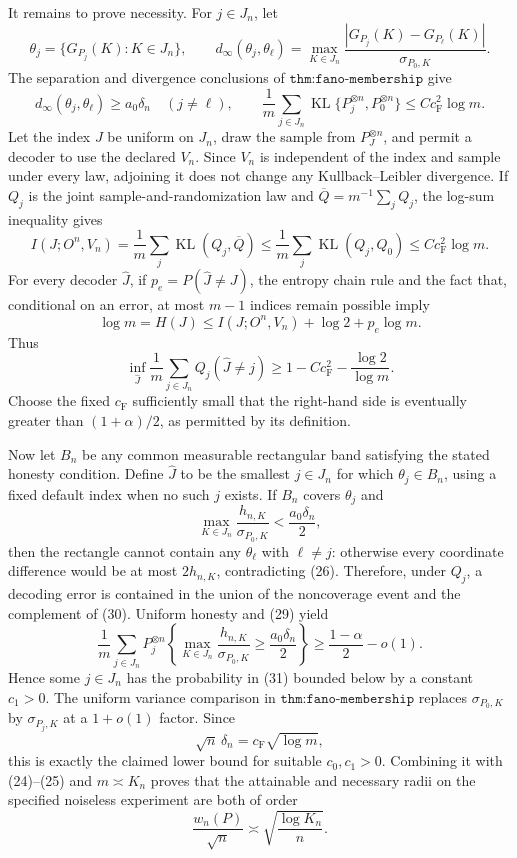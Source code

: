It remains to prove necessity.  For \(j\in J_n\), let
\[
 \theta_j=\{G_{P_j}(K):K\in J_n\},\qquad
 d_\infty(\theta_j,\theta_\ell)
 =\max_{K\in J_n}
 \frac{|G_{P_j}(K)-G_{P_\ell}(K)|}{\sigma_{P_0,K}}.
\]
The separation and divergence conclusions of \(\texttt{thm:fano-membership}\) give
\[
 d_\infty(\theta_j,\theta_\ell)\geq a_0\delta_n
 \quad(j\ne\ell),\qquad
 \frac1m\sum_{j\in J_n}
 \operatorname{KL}\{P_j^{\otimes n},P_0^{\otimes n}\}
 \leq Cc_{\mathrm F}^2\log m.
 \tag{26}
\]
Let the index \(J\) be uniform on \(J_n\), draw the sample from \(P_J^{\otimes n}\), and permit a decoder to use the declared \(V_n\).  Since \(V_n\) is independent of the index and sample under every law, adjoining it does not change any Kullback--Leibler divergence.  If \(Q_j\) is the joint sample-and-randomization law and \(\overline Q=m^{-1}\sum_jQ_j\), the log-sum inequality gives
\[
 I(J;O^n,V_n)
 =\frac1m\sum_j\operatorname{KL}(Q_j,\overline Q)
 \leq\frac1m\sum_j\operatorname{KL}(Q_j,Q_0)
 \leq Cc_{\mathrm F}^2\log m.
 \tag{27}
\]
For every decoder \(\widehat J\), if \(p_e=P(\widehat J\ne J)\), the entropy chain rule and the fact that, conditional on an error, at most \(m-1\) indices remain possible imply
\[
 \log m=H(J)
 \leq I(J;O^n,V_n)+\log2+p_e\log m.
 \tag{28}
\]
Thus
\[
 \inf_{\widehat J}\frac1m\sum_{j\in J_n}Q_j(\widehat J\ne j)
 \geq1-Cc_{\mathrm F}^2-\frac{\log2}{\log m}.
 \tag{29}
\]
Choose the fixed \(c_{\mathrm F}\) sufficiently small that the right-hand side is eventually greater than \((1+\alpha)/2\), as permitted by its definition.

Now let \(B_n\) be any common measurable rectangular band satisfying the stated honesty condition.  Define \(\widehat J\) to be the smallest \(j\in J_n\) for which \(\theta_j\in B_n\), using a fixed default index when no such \(j\) exists.  If \(B_n\) covers \(\theta_j\) and
\[
 \max_{K\in J_n}\frac{h_{n,K}}{\sigma_{P_0,K}}
 <\frac{a_0\delta_n}{2},
 \tag{30}
\]
then the rectangle cannot contain any \(\theta_\ell\) with \(\ell\ne j\): otherwise every coordinate difference would be at most \(2h_{n,K}\), contradicting (26).  Therefore, under \(Q_j\), a decoding error is contained in the union of the noncoverage event and the complement of (30).  Uniform honesty and (29) yield
\[
 \frac1m\sum_{j\in J_n}
 P_j^{\otimes n}\!\left\{
 \max_{K\in J_n}\frac{h_{n,K}}{\sigma_{P_0,K}}
 \geq\frac{a_0\delta_n}{2}\right\}
 \geq \frac{1-\alpha}{2}-o(1).
 \tag{31}
\]
Hence some \(j\in J_n\) has the probability in (31) bounded below by a constant \(c_1>0\).  The uniform variance comparison in \(\texttt{thm:fano-membership}\) replaces \(\sigma_{P_0,K}\) by \(\sigma_{P_j,K}\) at a \(1+o(1)\) factor.  Since
\[
 \sqrt n\,\delta_n=c_{\mathrm F}\sqrt{\log m},
\]
this is exactly the claimed lower bound for suitable \(c_0,c_1>0\).  Combining it with (24)--(25) and \(m\asymp K_n\) proves that the attainable and necessary radii on the specified noiseless experiment are both of order
\[
 \frac{w_n(P)}{\sqrt n}\asymp\sqrt{\frac{\log K_n}{n}}.
\]